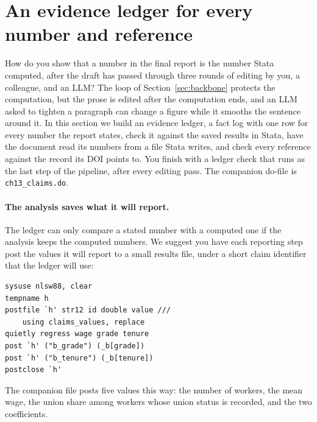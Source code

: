 \section{An evidence ledger for every number and reference}\label{sec:ledger}
How do you show that a number in the final report is the number Stata computed, after the draft has passed through three rounds of editing by you, a colleague, and an LLM? The loop of Section~\ref{sec:backbone} protects the computation, but the prose is edited after the computation ends, and an LLM asked to tighten a paragraph can change a figure while it smooths the sentence around it. In this section we build an evidence ledger, a fact log with one row for every number the report states, check it against the saved results in Stata, have the document read its numbers from a file Stata writes, and check every reference against the record its DOI points to. You finish with a ledger check that runs as the last step of the pipeline, after every editing pass. The companion do-file is \texttt{ch13\_claims.do}.

\paragraph{The analysis saves what it will report.} The ledger can only compare a stated number with a computed one if the analysis keeps the computed numbers. We suggest you have each reporting step post the values it will report to a small results file, under a short claim identifier that the ledger will use:
\par
{\footnotesize
\begin{verbatim}
sysuse nlsw88, clear
tempname h
postfile `h' str12 id double value ///
    using claims_values, replace
quietly regress wage grade tenure
post `h' ("b_grade") (_b[grade])
post `h' ("b_tenure") (_b[tenure])
postclose `h'
\end{verbatim}
}
The companion file posts five values this way: the number of workers, the mean wage, the union share among workers whose union status is recorded, and the two coefficients.

